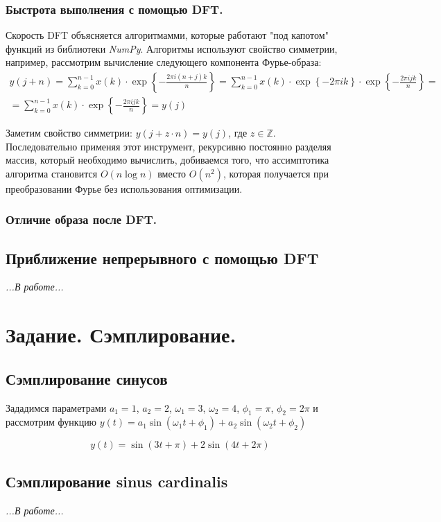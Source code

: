 \documentclass[a5paper, 10pt]{article}
\theoremstyle{definition}
\theoremstyle{plain}
\theoremstyle{remark}
\begin{document}
\subsubsection{ Быстрота выполнения с помощью DFT.}
Скорость DFT объясняется алгоритмамми, которые работают "под капотом" функций из библиотеки \textit{NumPy}. Алгоритмы используют свойство симметрии, например, рассмотрим вычисление следующего компонента Фурье-образа:
\begin{multline}
y(j + n) = \sum \limits_{k=0}^{n-1} x(k) \cdot \exp \left\{ - \frac{2\pi  i (n + j) k}{n} \right\} =  \sum \limits_{k=0}^{n-1} x(k) \cdot \exp \left\{ - 2\pi  i  k \right\} \cdot \exp \left\{ - \frac{2\pi  i  j k}{n} \right\} =\\= \sum \limits_{k=0}^{n-1} x(k) \cdot \exp \left\{ - \frac{2\pi  i  j k}{n} \right\} = y(j)
\end{multline}

Заметим свойство симметрии: $y(j + z \cdot n) = y(j)$, где $z \in \mathbb{Z}$.\\

 Последовательно применяя этот инструмент, рекурсивно постоянно разделяя массив, который необходимо вычислить, добиваемся того, что ассимптотика алгоритма становится $O(n \log n)$ вместо $O(n^2)$, которая получается при преобразовании Фурье без использования оптимизации.


\newpage
\subsubsection{Отличие образа после DFT.}






\subsection{Приближение непрерывного с помощью DFT}
\textit{...В работе...}








\newpage
\section{Задание. Сэмплирование.}

\subsection{Сэмплирование синусов}
Зададимся параметрами $a_1=1$, $a_2=2$, $\omega_1 = 3$, $\omega_2 = 4$, $\phi_1 = \pi$, $\phi_2 = 2\pi$ и рассмотрим функцию $y(t) = a_1 \sin \left( \omega_1 t + \phi_1 \right) + a_2 \sin \left(  \omega_2 t + \phi_2 \right)$

\begin{equation}
y(t) =  \sin \left( 3 t + \pi \right) + 2 \sin \left(  4 t + 2\pi \right)
\end{equation}




\subsection{Сэмплирование sinus cardinalis}
\textit{...В работе...}
\end{document}
